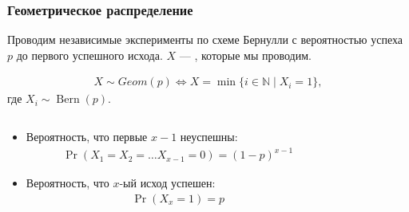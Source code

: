 \documentclass[hyperref=unicode,graphics=pdflatex,13pt,xcolor={usenames,dvipsnames}]{beamer}
\renewcommand\emph[1]{{\color{blue}{#1}}}
\newcommand\N{\mathbb{N}}
\DeclareMathOperator{\Bern}{Bern}
\begin{document}
\begin{frame}
  \frametitle{Геометрическое распределение}
  Проводим независимые эксперименты по схеме Бернулли с вероятностью успеха $p$ до первого успешного исхода. $X$ --- \emph{число экспериментов}, которые мы проводим.

  \begin{align*}
    X \sim Geom(p) \Leftrightarrow X = \min\{i \in \N \mid X_i = 1\},
  \end{align*}
  где $X_i \sim \Bern(p)$.
  
  \pause

  \begin{center}
  \end{center}

  \pause
  \begin{columns}
    \begin{column}{0.75\textwidth}
      \begin{itemize}
        \item Вероятность, что первые $x - 1$ неуспешны:
        \begin{align*}
          \Pr(X_1 = X_2 = \dots X_{x - 1} = 0) = (1 - p)^{x - 1}
        \end{align*}
        \item Вероятность, что $x$-ый исход успешен: 
        \begin{align*}
          \Pr(X_x = 1) = p 
        \end{align*}
      \end{itemize}
    \end{column}
    \begin{column}{0.25\textwidth}
    \end{column}
  \end{columns}
\end{frame}
\end{document}
